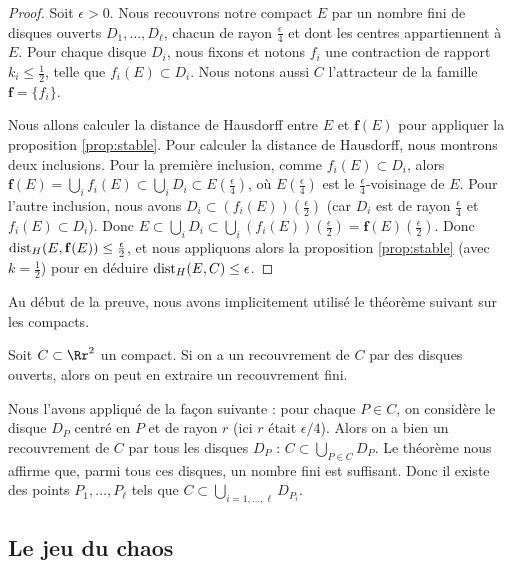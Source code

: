 \documentclass[11pt,class=report,crop=false]{standalone}
\begin{document}
\begin{proof}
Soit $\epsilon >0$. Nous recouvrons notre compact 
$E$ par un nombre fini de disques ouverts $D_1,\ldots,D_\ell$,
chacun de rayon $\frac{\epsilon}{4}$ et dont les centres appartiennent à $E$.
Pour chaque disque $D_i$, nous fixons et notons $f_i$ une contraction de rapport $k_i \le \frac 12$,
telle que $f_i(E)\subset D_i$. Nous notons aussi $C$ l'attracteur de la famille $\mathbf{f}=\{f_i\}$.

Nous allons calculer la distance de Hausdorff entre $E$ et $\mathbf{f}(E)$ pour appliquer
la proposition \ref{prop:stable}.
Pour calculer la distance de Hausdorff, nous montrons deux inclusions.
Pour la première inclusion, comme $f_i(E) \subset D_i$, alors $\mathbf{f}(E)=\bigcup_{i} f_i(E) \subset \bigcup_i D_i
\subset E(\frac{\epsilon}{4})$, où $E(\frac{\epsilon}{4})$ est le $\frac{\epsilon}{4}$-voisinage de $E$.
Pour l'autre inclusion, nous avons $D_i \subset (f_i(E))(\frac \epsilon 2)$ 
(car $D_i$ est de rayon $\frac\epsilon 4$ et $f_i(E) \subset D_i$).
Donc $E \subset \bigcup_i D_i \subset \bigcup_i (f_i(E))(\frac \epsilon 2) = \mathbf{f}(E)(\frac\epsilon 2)$.
Donc $\text{dist}_H(E,\mathbf{f}(E)) \le \frac \epsilon 2$, et nous appliquons alors
la proposition \ref{prop:stable} (avec $k=\frac12$) pour en déduire $\text{dist}_H(E,C) \le \epsilon$.
\end{proof}

\bigskip

Au début de la preuve, nous avons implicitement utilisé le théorème suivant sur les compacts.
\begin{theoreme}
Soit $C \subset \Rr^2$ un compact.
Si on a un recouvrement de $C$ par des disques ouverts, alors on peut en extraire un recouvrement fini. 
\end{theoreme}
Nous l'avons appliqué de la façon suivante :
pour chaque $P \in C$, on considère le disque $D_P$ centré en $P$ et de rayon $r$ 
(ici $r$ était $\epsilon/4$). Alors on a bien un recouvrement de $C$ par tous les disques $D_P$ :
$C \subset \bigcup_{P\in C} D_P$. Le théorème nous affirme que, parmi tous ces disques, un nombre fini est suffisant.
Donc il existe des points $P_1,\ldots, P_\ell$ tels que $C \subset \bigcup_{i=1,\ldots,\ell} D_{P_i}$.


\subsection{Le jeu du chaos}
\label{ssec:chaos}
\end{document}

